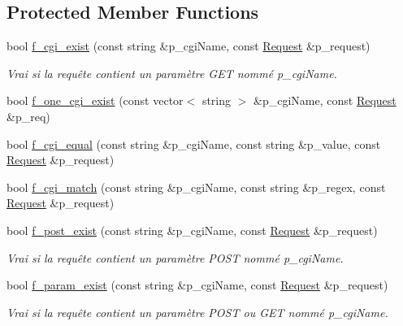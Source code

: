 \subsection*{Protected Member Functions}
\begin{DoxyCompactItemize}
\item 
bool \hyperlink{classxtd_1_1network_1_1http_1_1Server_a90d357c7890d9ca17d5eeb38a33343f6}{f\+\_\+cgi\+\_\+exist} (const string \&p\+\_\+cgi\+Name, const \hyperlink{classxtd_1_1network_1_1http_1_1Request}{Request} \&p\+\_\+request)
\begin{DoxyCompactList}\small\item\em Vrai si la requête contient un paramètre G\+ET nommé p\+\_\+cgi\+Name. \end{DoxyCompactList}\item 
bool \hyperlink{classxtd_1_1network_1_1http_1_1Server_aa66d761aaa278f3123aa11d565475281}{f\+\_\+one\+\_\+cgi\+\_\+exist} (const vector$<$ string $>$ \&p\+\_\+cgi\+Name, const \hyperlink{classxtd_1_1network_1_1http_1_1Request}{Request} \&p\+\_\+req)
\item 
bool \hyperlink{classxtd_1_1network_1_1http_1_1Server_a66975ce2c93998c5e5916ee93ac8bf99}{f\+\_\+cgi\+\_\+equal} (const string \&p\+\_\+cgi\+Name, const string \&p\+\_\+value, const \hyperlink{classxtd_1_1network_1_1http_1_1Request}{Request} \&p\+\_\+request)
\item 
bool \hyperlink{classxtd_1_1network_1_1http_1_1Server_ae8122d6287a52f0933af7ab687710768}{f\+\_\+cgi\+\_\+match} (const string \&p\+\_\+cgi\+Name, const string \&p\+\_\+regex, const \hyperlink{classxtd_1_1network_1_1http_1_1Request}{Request} \&p\+\_\+request)
\item 
bool \hyperlink{classxtd_1_1network_1_1http_1_1Server_adbd0e1d940294921e1d79b7e747d98fb}{f\+\_\+post\+\_\+exist} (const string \&p\+\_\+cgi\+Name, const \hyperlink{classxtd_1_1network_1_1http_1_1Request}{Request} \&p\+\_\+request)
\begin{DoxyCompactList}\small\item\em Vrai si la requête contient un paramètre P\+O\+ST nommé p\+\_\+cgi\+Name. \end{DoxyCompactList}\item 
bool \hyperlink{classxtd_1_1network_1_1http_1_1Server_a9f45a8c3b4a6dfa05041cb7190317c4e}{f\+\_\+param\+\_\+exist} (const string \&p\+\_\+cgi\+Name, const \hyperlink{classxtd_1_1network_1_1http_1_1Request}{Request} \&p\+\_\+request)
\begin{DoxyCompactList}\small\item\em Vrai si la requête contient un paramètre P\+O\+ST ou G\+ET nommé p\+\_\+cgi\+Name. \end{DoxyCompactList}\item 

\end{DoxyCompactItemize}
